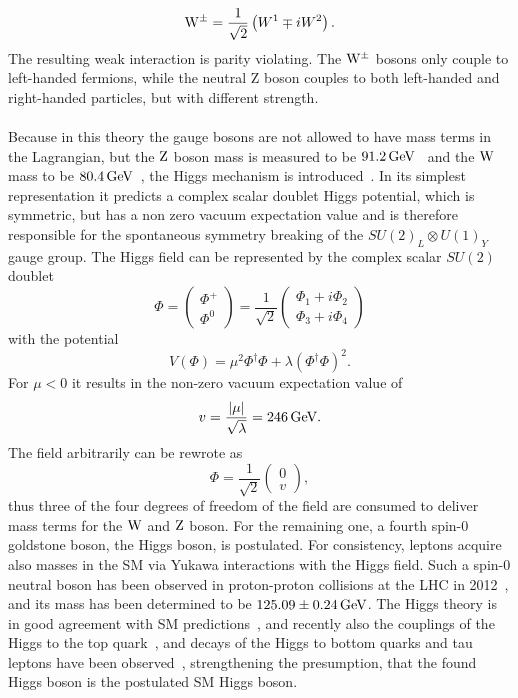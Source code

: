 \begin{equation}
 \mathrm{W}^\pm = \frac{1}{\sqrt{2}}\left(W^1\mp i W^2\right).
\end{equation}
The resulting weak interaction is parity violating. The $\mathrm{W}^\pm$ bosons only couple to left-handed fermions, while the neutral Z boson couples to both left-handed and right-handed particles, but with different strength.\\
\\Because in this theory the gauge bosons are not allowed to have mass terms in the Lagrangian, but the $\mathrm{Z}$ boson mass is measured to be $91.2\,\text{Ge\hspace{-.08em}V}$~\cite{PDG} and the $\mathrm{W}$ mass to be $80.4\,\text{Ge\hspace{-.08em}V}$~\cite{PDG}, the Higgs mechanism is introduced~\cite{Higgs1,Higgs2,Higgs3}. In its simplest representation it predicts a complex scalar doublet Higgs potential, which is symmetric, but has a non zero vacuum expectation value and is therefore responsible for the spontaneous symmetry breaking of the $ SU(2)_L\otimes U(1)_Y$ gauge group. The Higgs field can be represented by the complex scalar $SU(2)$ doublet
\begin{equation}
 \Phi=
 \left(\begin{matrix}
   \Phi^{+} \\
   \Phi^0
  \end{matrix}
 \right)
 =
 \frac{1}{\sqrt{2}}
 \left(\begin{matrix}
   \Phi_1 + i \Phi_2 \\
   \Phi_3 + i\Phi_4
  \end{matrix}
 \right)
\end{equation}
with the potential
\begin{equation}
 V(\Phi)=\mu^2 \Phi^{\dagger}\Phi+\lambda\left(\Phi^{\dagger}\Phi\right)^2.
\end{equation}
For $\mu<0$ it results in the non-zero vacuum expectation value of
\begin{equation}
 v = \frac{|\mu|}{\sqrt{\lambda}}= 246\,\text{Ge\hspace{-.08em}V}.
\end{equation}
The field arbitrarily can be rewrote as
\begin{equation}
 \Phi = \frac{1}{\sqrt{2}}
 \left(\begin{matrix}
   0 \\
   v
  \end{matrix}
 \right),
\end{equation} thus three of the four degrees of freedom of the field are consumed to deliver mass terms for the $\mathrm{W}$ and $\mathrm{Z}$ boson. For the remaining one, a fourth spin-0 goldstone boson, the Higgs boson, is postulated. For consistency, leptons acquire also masses in the SM via Yukawa interactions with the Higgs field.
Such a spin-0 neutral boson has been observed in proton-proton collisions at the LHC in 2012~\cite{HiggsCMS,HiggsATLAS}, and its mass has been determined to be $125.09\pm0.24\,\text{Ge\hspace{-.08em}V}$. The Higgs theory is in good agreement with SM predictions~\cite{HiggsPrecise}, and recently also the couplings of the Higgs to the top quark~\cite{ttH}, and decays of the Higgs to bottom quarks and tau leptons have been observed~\cite{HiggsTauTau,HiggsBB}, strengthening the presumption, that the found Higgs boson is the postulated SM Higgs boson.



